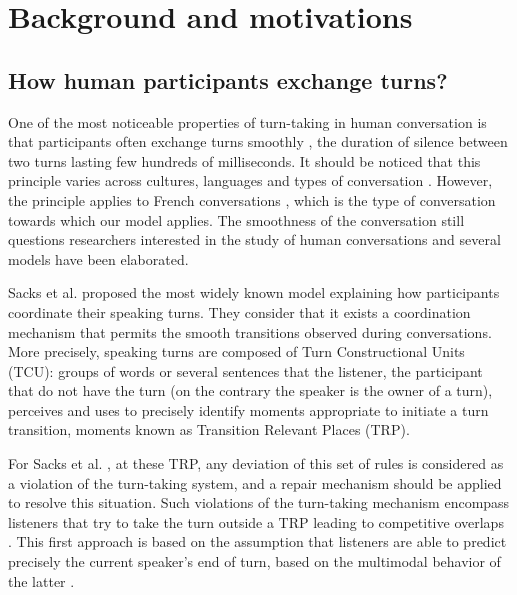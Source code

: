 
\section{Background and motivations}
\label{backgd}

\subsection{How human participants exchange turns?}
\label{social_psychology}

One of the most noticeable properties of turn-taking in human conversation is that participants often exchange turns
smoothly \citep{heldner_pauses_2010}, the duration of silence between two turns lasting few hundreds of milliseconds. 
It should be noticed that this principle
varies across cultures, languages and types of conversation \citep{oconnell_turntaking_2008,stivers_universals_2009}.
However, the principle applies to French conversations \citep{mondada_multimodal_2007}, 
which is the type of conversation towards which our model applies.
The smoothness of the conversation still questions researchers interested in the study of human conversations 
and several models have been elaborated. %
 
Sacks et al. \citep{sacks_simplest_1974} proposed the most widely known model explaining how participants coordinate their speaking turns.
They consider that it exists a coordination mechanism that permits the smooth transitions observed during conversations.
More precisely, speaking turns are composed of Turn Constructional Units (TCU): groups of words or several sentences that the listener, the participant that do not have the turn (on the contrary the speaker is the owner of a turn), perceives and uses to precisely identify moments appropriate to initiate a turn transition, moments known as Transition Relevant Places (TRP).

For Sacks et al. \citep{sacks_simplest_1974}, at these TRP, any deviation of this set of rules is considered
as a violation of the turn-taking system, and a repair mechanism should be applied to resolve this situation.
Such violations of the turn-taking mechanism encompass listeners that try to take the turn outside a
TRP leading to competitive overlaps \citep{schegloff_overlapping_2000}.
This first approach is based on the assumption that
listeners are able to predict precisely the current speaker's end of turn, based on the multimodal behavior
of the latter \citep{de_ruiter_projecting_2006,french_turn-competitive_1983,ford_interactional_1996,mondada_multimodal_2007}. 

